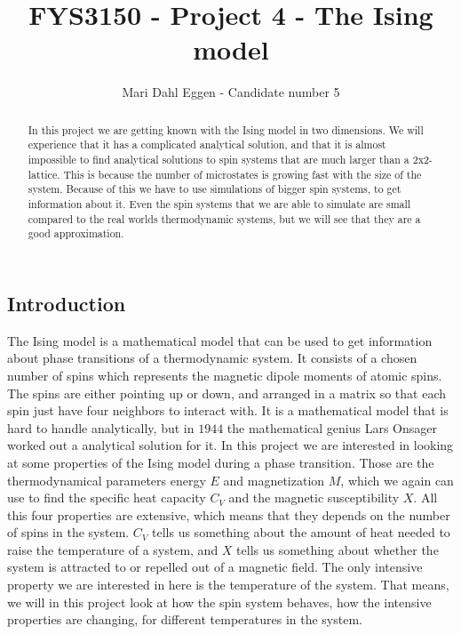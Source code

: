 \documentclass[12pt]{article}
\begin{document}
\title{FYS3150 - Project 4 - The Ising model}
\author{Mari Dahl Eggen - Candidate number 5}
\maketitle

\newpage

\tableofcontents

\begin{flushleft}
\newpage
\begin{abstract}
In this project we are getting known with the Ising model in two dimensions. We will experience that it has a complicated analytical solution, and that it is almost impossible to find analytical solutions to spin systems that are much larger than a 2x2-lattice. This is  because the number of microstates is growing fast with the size of the system. Because of this we have to use simulations of bigger spin systems, to get information about it. Even the spin systems that we are able to simulate are small compared to the real worlds thermodynamic systems, but we will see that they are a good approximation.   
\end{abstract}
\section{Introduction}
The Ising model is a mathematical model that can be used to get information about  phase transitions of a thermodynamic system. It consists of a chosen number of spins which represents the magnetic dipole moments of atomic spins. The spins are either pointing up or down, and arranged in a matrix so that each spin just have four neighbors to interact with. It is a mathematical model that is hard to handle analytically, but in $1944$ the mathematical genius Lars Onsager worked out a analytical solution for it. In this project we are interested in looking at some properties of the Ising model during a phase transition. Those are the  thermodynamical parameters energy $E$ and magnetization $M$, which we again can use to find the specific heat capacity $C_V$ and the magnetic susceptibility $X$. All this four properties are extensive, which means that they depends on the number of spins in the system.  $C_V$ tells us something about the amount of heat needed to raise the temperature of a system, and $X$ tells us something about whether the system is attracted to or repelled out of a magnetic field. The only intensive property we are interested in here is the temperature of the system. That means, we will in this project look at how the spin system behaves, how the intensive properties are changing, for different temperatures in the system. 
\newpage

\end{flushleft}
\end{document}
